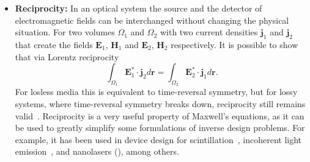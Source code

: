 \begin{itemize}
        \item \textbf{Reciprocity:} In an optical system the source and the
              detector of electromagnetic fields can be interchanged without changing the
              physical situation. For two volumes $\Omega_1$ and
              $\Omega_2$
              with two current densities $\mathbf{j}_1$ and $\mathbf{j}_2$ that create
              the fields $\mathbf{E}_1$, $\mathbf{H}_1$ and $\mathbf{E}_2$, $\mathbf{H}_2$
              respectively. It is possible to show that via Lorentz reciprocity~\cite{novotny}
              \begin{equation}
                  \int_{\Omega_1} \mathbf{E}_1^* \cdot \mathbf{j}_2 d\mathbf{r} = \int_{\Omega_2}
                  \mathbf{E}_2^* \cdot \mathbf{j}_1 d\mathbf{r}.
              \end{equation}
              For losless media this is equivalent to time-reversal symmetry, but for
              lossy systems, where time-reversal symmetry breaks down, reciprocity still remains valid~\cite{Carminati:98}. Reciprocity
              is a very useful property of Maxwell's equations, as it can be used to
              greatly simplify some formulations of inverse design problems. For example, it has been used in device design for
              scintillation~\cite{Roques_Carmes_2022}, incoherent light emission~\cite{LED_opt, Yao_2022}, and nanolasers (\cite{ownpub4}), among others.
    \end{itemize}



